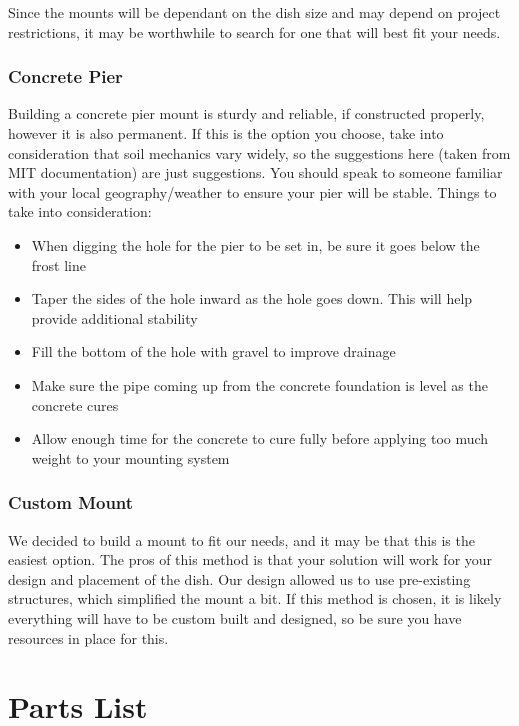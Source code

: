 \documentclass[11pt]{article} %
\begin{document}
Since the mounts will be dependant on the dish size and may depend on project restrictions, it may be worthwhile to search for one that will best fit your needs. 

\subsubsection{Concrete Pier}

Building a concrete pier mount is sturdy and reliable, if constructed properly, however it is also permanent. If this is the option you choose, take into consideration that soil mechanics vary widely, so the suggestions here (taken from MIT documentation) are just suggestions. You should speak to someone familiar with your local geography/weather to ensure your pier will be stable. Things to take into consideration:

\begin{itemize}
\item When digging the hole for the pier to be set in, be sure it goes below the frost line
\item Taper the sides of the hole inward as the hole goes down. This will help provide additional stability
\item Fill the bottom of the hole with gravel to improve drainage
\item Make sure the pipe coming up from the concrete foundation is level as the concrete cures
\item Allow enough time for the concrete to cure fully before applying too much weight to your mounting system
\end{itemize}

\subsubsection{Custom Mount}

We decided to build a mount to fit our needs, and it may be that this is the easiest option. The pros of this method is that your solution will work for your design and placement of the dish. Our design allowed us to use pre-existing structures, which simplified the mount a bit. If this method is chosen, it is likely everything will have to be custom built and designed, so be sure you have resources in place for this. 



\newpage

\section{Parts List}
\end{document}
